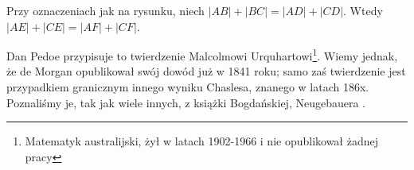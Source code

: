 \begin{theorem}[Urquharta?]
%
    Przy oznaczeniach jak na rysunku, niech $|AB| + |BC| = |AD| + |CD|$.
    Wtedy $|AE| + |CE| = |AF| + |CF|$.
\end{theorem}

Dan Pedoe
przypisuje to twierdzenie Malcolmowi Urquhartowi\footnote{Matematyk australijski, żył w latach 1902-1966 i nie opublikował żadnej pracy}.
%
Wiemy jednak, że de Morgan opublikował swój dowód już w 1841 roku; samo zaś twierdzenie jest przypadkiem granicznym innego wyniku Chaslesa, znanego w latach 186x.
Poznaliśmy je, tak jak wiele innych, z książki Bogdańskiej, Neugebauera \cite[s. 97]{neugebauer_2018}.